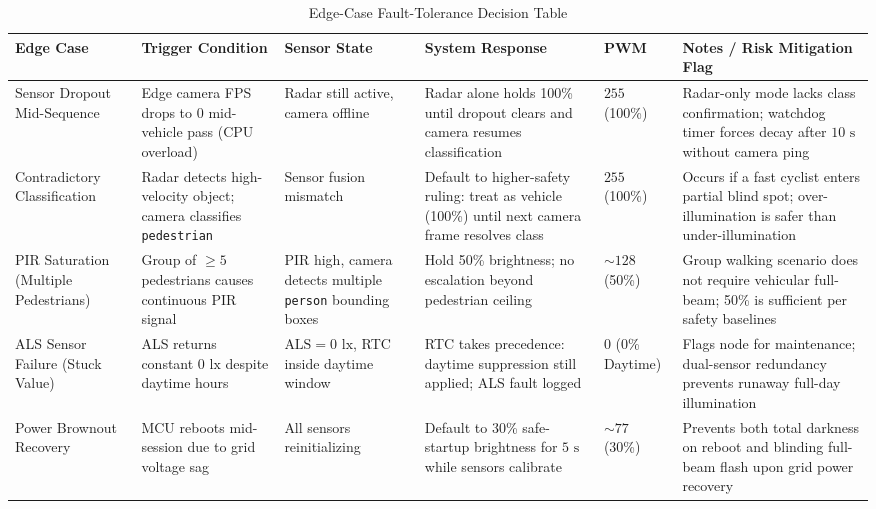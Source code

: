 \documentclass[11pt,a4paper]{article}
\begin{document}
\begin{table}[tbp]
\centering
\caption{Edge-Case Fault-Tolerance Decision Table}
\label{tab:edge_cases}
\footnotesize
\setlength{\tabcolsep}{3pt}
\begin{tabularx}{\textwidth}{>{\raggedright\arraybackslash}p{2.0cm}>{\raggedright\arraybackslash}p{2.5cm}>{\raggedright\arraybackslash}p{2.0cm}>{\raggedright\arraybackslash}X>{\centering\arraybackslash}p{1.2cm}>{\raggedright\arraybackslash}X}
\toprule
\textbf{Edge Case} & \textbf{Trigger Condition} & \textbf{Sensor State} & \textbf{System Response} & \textbf{PWM} & \textbf{Notes / Risk Mitigation Flag} \\
\midrule
Sensor Dropout Mid-Sequence & Edge camera FPS drops to 0 mid-vehicle pass (CPU overload) & Radar still active, camera offline & Radar alone holds 100\% until dropout clears and camera resumes classification & $255$ (100\%) & Radar-only mode lacks class confirmation; watchdog timer forces decay after \(10\text{ s}\) without camera ping \\
\midrule
Contradictory Classification & Radar detects high-velocity object; camera classifies \texttt{pedestrian} & Sensor fusion mismatch & Default to higher-safety ruling: treat as vehicle (100\%) until next camera frame resolves class & $255$ (100\%) & Occurs if a fast cyclist enters partial blind spot; over-illumination is safer than under-illumination \\
\midrule
PIR Saturation (Multiple Pedestrians) & Group of \(\ge 5\) pedestrians causes continuous PIR signal & PIR high, camera detects multiple \texttt{person} bounding boxes & Hold 50\% brightness; no escalation beyond pedestrian ceiling & \(\sim 128\) (50\%) & Group walking scenario does not require vehicular full-beam; 50\% is sufficient per safety baselines \\
\midrule
ALS Sensor Failure (Stuck Value) & ALS returns constant \(0\text{ lx}\) despite daytime hours & \(\text{ALS} = 0\text{ lx}\), RTC inside daytime window & RTC takes precedence: daytime suppression still applied; ALS fault logged & $0$ (0\% Daytime) & Flags node for maintenance; dual-sensor redundancy prevents runaway full-day illumination \\
\midrule
Power Brownout Recovery & MCU reboots mid-session due to grid voltage sag & All sensors reinitializing & Default to 30\% safe-startup brightness for \(5\text{ s}\) while sensors calibrate & \(\sim 77\) (30\%) & Prevents both total darkness on reboot and blinding full-beam flash upon grid power recovery \\
\bottomrule
\end{tabularx}
\end{table}
\end{document}
